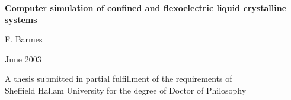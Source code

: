 %
%

\vspace*{4cm}

\begin{center}
	\Huge{\textbf{Computer simulation of confined and flexoelectric liquid crystalline
	systems}}
\end{center}


\vspace*{10mm}
\begin{center}
	\Large{F. Barmes}
\end{center}

\vspace*{10mm}
\begin{center}
	\Large{June 2003}
\end{center}

\vspace*{7cm}
{\large  A thesis submitted in partial fulfillment of the requirements of \\
         Sheffield Hallam University 
         for the degree of Doctor of Philosophy }



